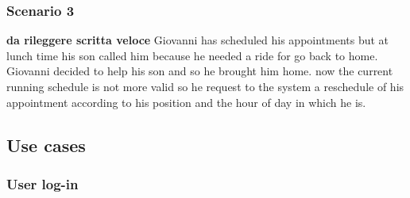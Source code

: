 \subsubsection{Scenario 3} \label{scenario:3}
\textbf{da rileggere scritta veloce}
Giovanni has scheduled his appointments but at lunch time his son called him because he needed a ride for go back to home. Giovanni decided to help his son and so he brought him home. now the current running schedule is not more valid so he request to the system a reschedule of his appointment according to his position and the hour of day in which he is.  

\subsection{Use cases}

\subsubsection{User log-in}

